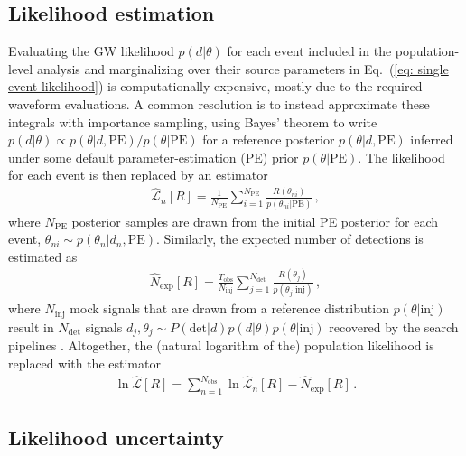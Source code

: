 \documentclass[%
reprint,
 amsmath,amssymb,
 aps,
 prd,nofootinbib,nobibnotes,
 superscriptaddress,groupedaddress,
]{revtex4-2}
\begin{document}
\subsection{Likelihood estimation}
\label{sec: Likelihood estimation}

Evaluating the GW likelihood $p(d|\theta)$ for each event included in the population-level analysis and marginalizing over their source parameters in Eq.~(\ref{eq: single event likelihood}) is computationally expensive, mostly due to the required waveform evaluations. A common resolution is to instead approximate these integrals with importance sampling, using Bayes' theorem to write $p(d|\theta) \propto p(\theta|d,\mathrm{PE}) / p(\theta|\mathrm{PE})$ for a reference posterior $p(\theta|d,\mathrm{PE})$ inferred under some default parameter-estimation (PE) prior $p(\theta|\mathrm{PE})$. The likelihood for each event is then replaced by an estimator
\begin{align}
\label{eq: single event likelihood estimator}
\hat{\mathcal{L}}_n[R]
=
\frac{ 1 }{ N_\mathrm{PE} }
\sum_{i=1}^{N_\mathrm{PE}}
\frac{ R ( \theta_{ni} ) }{ p ( \theta_{ni} | \mathrm{PE} ) }
\, ,
\end{align}
where $N_\mathrm{PE}$ posterior samples are drawn from the initial PE posterior for each event, $\theta_{ni} \sim p(\theta_n|d_n,\mathrm{PE})$.
Similarly, the expected number of detections is estimated as 
\begin{align}
\hat{N}_\mathrm{exp}[R]
=
\frac{ T_\mathrm{obs} }{ N_\mathrm{inj} }
\sum_{j=1}^{N_\mathrm{det}}
\frac{ R ( \theta_j ) }{ p ( \theta_j | \mathrm{inj} ) }
\, ,
\label{eq: Nexp estimator}
\end{align}
where $N_\mathrm{inj}$ mock signals that are drawn from a reference distribution $p(\theta|\mathrm{inj})$ result in $N_\mathrm{det}$ signals $d_j,\theta_j \sim P(\mathrm{det}|d) p(d|\theta) p(\theta|\mathrm{inj})$ recovered by the search pipelines \cite{Tiwari:2017ndi,Farr:2019rap}. Altogether, the (natural logarithm of the) population likelihood is replaced with the estimator
\begin{align}
\label{eq: total ln likelihood estimator}
\ln \hat{\mathcal{L}}[R]
=
\sum_{n=1}^{N_\mathrm{obs}}
\ln \hat{\mathcal{L}}_n[R]
-
\hat{N}_\mathrm{exp}[R]
\, .
\end{align}


\subsection{Likelihood uncertainty}
\label{sec: Likelihood uncertainty}
\end{document}
